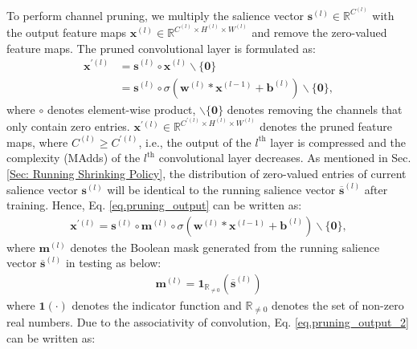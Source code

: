 \documentclass[lettersize,journal]{IEEEtran}
\begin{document}
To perform channel pruning, we multiply the salience vector $\boldsymbol{s}^{(l)} \in \mathbb{R}^{C^{(l)}}$ with the output feature maps $\boldsymbol{x}^{(l)}\in \mathbb{R}^{C^{(l)}\times H^{(l)}\times W^{(l)}}$ and remove the zero-valued feature maps. 
The pruned convolutional layer is formulated as:
\begin{equation}
  \begin{aligned}
  \label{eq.pruning_output}
  \boldsymbol{x}^{\prime(l)}&=\boldsymbol{s}^{(l)}\circ\boldsymbol{x}^{(l)}\backslash\{\boldsymbol{0}\}\\
  &=\boldsymbol{s}^{(l)}\circ\sigma(\boldsymbol{w}^{(l)}*\boldsymbol{x}^{(l-1)}+\boldsymbol{b}^{(l)})\backslash\{\boldsymbol{0}\},
\end{aligned}  
\end{equation}
where $\circ$ denotes element-wise product, $\backslash\{\boldsymbol{0}\}$ denotes removing the channels that only contain zero entries.
$\boldsymbol{x}^{\prime(l)}\in\mathbb{R}^{C^{\prime(l)}\times H^{(l)}\times W^{(l)}}$ denotes the pruned feature maps, where $C^{(l)}\geq C^{\prime(l)}$, i.e., the output of the $l^{\text{th}}$ layer is compressed and the complexity (MAdds) of the $l^{\text{th}}$ convolutional layer decreases. As mentioned in Sec.\ref{Sec: Running Shrinking Policy}, the distribution of zero-valued entries of current salience vector $\boldsymbol{s}^{(l)}$ will be identical to the running salience vector $\overline{\boldsymbol{s}}^{(l)}$ after training. Hence,
Eq. \eqref{eq.pruning_output} can be written as: \textcolor{blue}{}
\begin{equation}
  \begin{aligned}
  \label{eq.pruning_output_2}
  \boldsymbol{x}^{\prime(l)}
  =\boldsymbol{s}^{(l)}\circ \boldsymbol{m}^{(l)}\circ\sigma(\boldsymbol{w}^{(l)}*\boldsymbol{x}^{(l-1)}+\boldsymbol{b}^{(l)})\backslash\{\boldsymbol{0}\},
\end{aligned}  
\end{equation}
where $\boldsymbol{m}^{(l)}$ denotes the Boolean mask generated from the running salience vector
$\overline{\boldsymbol{s}}^{(l)}$ in testing as below: 
\begin{align}
    \boldsymbol{m}^{(l)}=
      \boldsymbol{1}_{\mathbb{R}_{\ne 0}}(\overline{\boldsymbol{s}}^{(l)})
\end{align}
where $\boldsymbol{1}(\cdot)$ denotes the indicator function and $\mathbb{R}_{\ne 0}$ denotes the set of non-zero real numbers. 
Due to the associativity of convolution, Eq. \eqref{eq.pruning_output_2} can be written as: 
\end{document}
